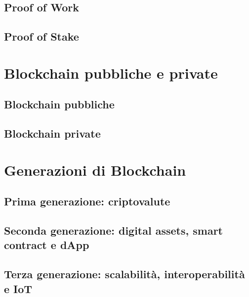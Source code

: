 \subsection{Proof of Work}

\subsection{Proof of Stake}

\section{Blockchain pubbliche e private}

\subsection{Blockchain pubbliche}

\subsection{Blockchain private}

\section{Generazioni di Blockchain}

\subsection{Prima generazione: criptovalute}

\subsection{Seconda generazione: digital assets, smart contract e dApp}

\subsection{Terza generazione: scalabilità, interoperabilità e IoT}
